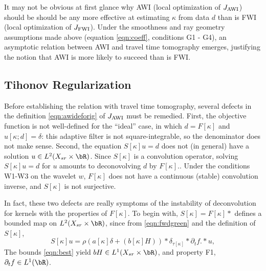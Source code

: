 It may not be obvious at first glance why AWI (local optimization of
$J_{\rm AWI}$) should be should be any more effective at estimating
$\kappa$ from data $d$ than is FWI (local
optimization of $J_{\rm FWI}$). Under the smoothness and ray geometry assumptions made above (equation
\ref{eqn:coeff}, conditions G1 - G4), an asymptotic relation
between AWI and travel time tomography emerges, justifying the notion
that AWI is more likely to succeed than is FWI.

\subsection{Tihonov Regularization}
Before establishing the relation with travel time tomography, several
defects in the definition \ref{eqn:awideforig} of $J_{\rm AWI}$ must be
remedied. First, the objective function is not well-defined for the
``ideal'' case, in which $d = F[\kappa]$ and $u[\kappa;d]=\delta$:
this adaptive filter is not square-integrable, so the denominator does
not make sense. Second, the equation $S[\kappa]u=d$ does not (in
general) have a solution $u \in L^2(X_{sr} \times \bR)$. Since
$S[\kappa]$ is a convolution operator, solving $S[\kappa]u=d$ for $u$
amounts to deconovolving $d$ by $F[\kappa]$..  Under the conditions
W1-W3 on the wavelet $w$, $F[\kappa]$ does not have a continuous
(stable) convolution inverse, and $S[\kappa]$ is not surjective.

In fact, these two defects are really symptoms of the instability of
deconvolution for kernels with the properties of $F[\kappa]$.  To
begin with, $S[\kappa] = F[\kappa]*$ defines a bounded map on
$L^2(X_{sr}\times \bR)$, since from \ref{eqn:fwdgreen} and the definition of
  $S[\kappa]$,
\[
  S[\kappa]u = \rho( a[\kappa]\delta    +  (b[\kappa]H)) *\delta_{\tau[\kappa]}*\partial_t f. *u,
\]
The bounds \ref{eqn:best} yield $bH \in
  L^1(X_{sr}\times \bR)$, and property F1, $\partial_t f \in
  L^1(\bR)$.

